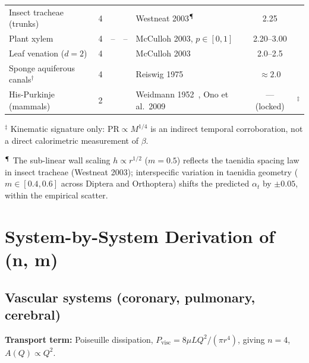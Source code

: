 \documentclass[11pt,a4paper]{article}
\theoremstyle{remark}
\begin{document}
\begin{table}[!h]
\begin{tabular}{@{}l c c c p{3.2cm} c c@{}}
Insect tracheae (trunks)  & 4 & \mTrachea{} & \atTrachea{} & Westneat 2003$^\mathparagraph$ &
2.25          & \cite{westneat2003}\\
Plant xylem               & 4 & \mXylemLo{}--\mXylemHi{} & \atXylemLo{}--\atXylemHi{} &
McCulloh 2003, $p\in[0,1]$ & 2.20--3.00 & \cite{mcculloh2003}\\
Leaf venation ($d=2$)     & 4 & \mLeaf{} & \atLeaf{} & McCulloh 2003          &
2.0--2.5      & \cite{mcculloh2003}\\
Sponge aquiferous canals$^\dagger$ & 4 & \mSponge{} & \atSponge{} & Reiswig 1975 &
$\approx 2.0$ & \cite{reiswig1975}\\
His-Purkinje (mammals) & 2 & \mHP{} & \atHP{} & Weidmann 1952~\cite{weidmann1952}, Ono et al.\ 2009~\cite{ono2009}
& --- (locked) & \cite{noujaim2004}$^{\ddagger}$ \\
\bottomrule
\end{tabular}
\vspace{0.15cm}
\raggedright \footnotesize $^{\ddagger}$ Kinematic signature only: $\mathrm{PR} \propto M^{1/4}$ is an indirect temporal corroboration, not a direct calorimetric measurement of $\beta$.

\raggedright \footnotesize $^\mathparagraph$ The sub-linear wall scaling $h \propto r^{1/2}$ ($m = 0.5$) reflects the taenidia spacing law in insect tracheae (Westneat 2003); interspecific variation in taenidia geometry ($m \in [0.4, 0.6]$ across Diptera and Orthoptera) shifts the predicted $\alpha_t$ by $\pm 0.05$, within the empirical scatter.
\end{table}

\section{System-by-System Derivation of (n, m)}

\subsection{Vascular systems (coronary, pulmonary, cerebral)}
\textbf{Transport term:} Poiseuille dissipation, $P_{\text{visc}} = 8\mu L Q^2 / (\pi r^4)$, giving $n=4$, $A(Q) \propto Q^2$.
\end{document}
